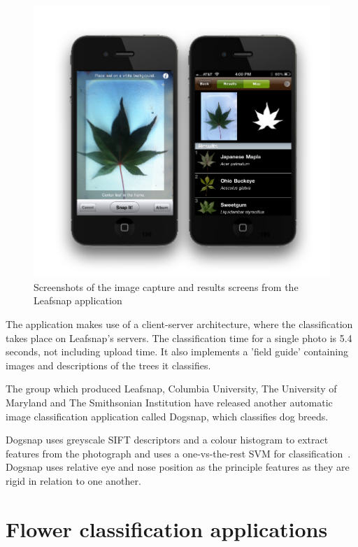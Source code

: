 \documentclass[11pt, a4paper]{report}
\begin{document}
\begin{figure}[hbt]
	\centering
  \includegraphics[totalheight=8cm]{img/35.png}
  \caption{Screenshots of the image capture and results screens from the Leafsnap application~\cite{leafsnap_eccv2012}}
  \label{img:35}
\end{figure}

The application makes use of a client-server architecture, where the classification takes place on Leafsnap's servers. The classification time for a single photo is 5.4 seconds, not including upload time. It also implements a 'field guide' containing images and descriptions of the trees it classifies.

The group which produced Leafsnap, Columbia University, The University of Maryland and The Smithsonian Institution have released another automatic image classification application called Dogsnap, which classifies dog breeds.

Dogsnap uses greyscale SIFT descriptors and a colour histogram to extract features from the photograph and uses a one-vs-the-rest SVM for classification~\cite{conf/eccv/LiuKJB12}. Dogsnap uses relative eye and nose position as the principle features as they are rigid in relation to one another. 


\section{Flower classification applications}
\end{document}
